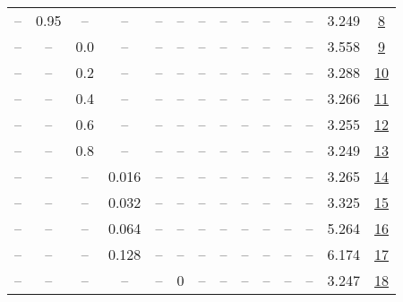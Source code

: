 \begin{table}[H]
\begin{tabular}{cccccccccccccc}
-- & 0.95 & -- & -- & -- & -- & -- & -- & -- & -- & -- & -- & 3.249 & \href{https://wandb.ai/stanford-mercury/optimizer-scaling/runs/sweep-130m-21B-scionj3bd025lr0.008-wd0.1-minlr0-warmup0-b10.95-g-681640}{8} \\
-- & -- & 0.0 & -- & -- & -- & -- & -- & -- & -- & -- & -- & 3.558 & \href{https://wandb.ai/stanford-mercury/optimizer-scaling/runs/sweep-130m-21B-scion5791a0lr0.008-wd0.1-minlr0-warmup0-b10.98-gn-7d7f4f}{9} \\
-- & -- & 0.2 & -- & -- & -- & -- & -- & -- & -- & -- & -- & 3.288 & \href{https://wandb.ai/stanford-mercury/optimizer-scaling/runs/sweep-130m-21B-sciona129e1lr0.008-wd0.1-minlr0-warmup0-b10.98-gn-c5ab97}{10} \\
-- & -- & 0.4 & -- & -- & -- & -- & -- & -- & -- & -- & -- & 3.266 & \href{https://wandb.ai/stanford-mercury/optimizer-scaling/runs/sweep-130m-21B-scionk8eae89lr0.008-wd0.1-minlr0-warmup0-b10.98-g-10c992}{11} \\
-- & -- & 0.6 & -- & -- & -- & -- & -- & -- & -- & -- & -- & 3.255 & \href{https://wandb.ai/stanford-mercury/optimizer-scaling/runs/sweep-130m-21B-scionk6861bflr0.008-wd0.1-minlr0-warmup0-b10.98-g-c52551}{12} \\
-- & -- & 0.8 & -- & -- & -- & -- & -- & -- & -- & -- & -- & 3.249 & \href{https://wandb.ai/stanford-mercury/optimizer-scaling/runs/sweep-130m-21B-scione2dcaclr0.008-wd0.1-minlr0-warmup0-b10.98-gn-61fe4b}{13} \\
-- & -- & -- & 0.016 & -- & -- & -- & -- & -- & -- & -- & -- & 3.265 & \href{https://wandb.ai/stanford-mercury/optimizer-scaling/runs/sweep-130m-21B-sciona69758lr0.016-wd0.1-minlr0-warmup0-b10.98-gn-84229e}{14} \\
-- & -- & -- & 0.032 & -- & -- & -- & -- & -- & -- & -- & -- & 3.325 & \href{https://wandb.ai/stanford-mercury/optimizer-scaling/runs/sweep-130m-21B-scion48e30elr0.032-wd0.1-minlr0-warmup0-b10.98-gn-b8cecb}{15} \\
-- & -- & -- & 0.064 & -- & -- & -- & -- & -- & -- & -- & -- & 5.264 & \href{https://wandb.ai/stanford-mercury/optimizer-scaling/runs/sweep-130m-21B-scion32f5fdlr0.064-wd0.1-minlr0-warmup0-b10.98-gn-4e855e}{16} \\
-- & -- & -- & 0.128 & -- & -- & -- & -- & -- & -- & -- & -- & 6.174 & \href{https://wandb.ai/stanford-mercury/optimizer-scaling/runs/sweep-130m-21B-scion14cd60lr0.128-wd0.1-minlr0-warmup0-b10.98-gn-100c56}{17} \\
-- & -- & -- & -- & -- & 0 & -- & -- & -- & -- & -- & -- & 3.247 & \href{https://wandb.ai/stanford-mercury/optimizer-scaling/runs/sweep-130m-21B-scion217e03lr0.008-wd0.1-minlr0-warmup0-b10.98-gn-7c4a34}{18} \\

\end{tabular}
\end{table}
